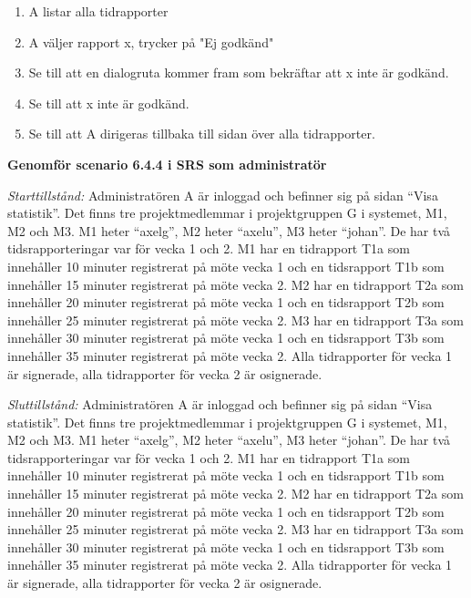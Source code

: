 \documentclass[a4paper]{article}
\begin{document}
\begin{ST}
\begin{enumerate}
\item A listar alla tidrapporter
\item A väljer rapport x, trycker på "Ej godkänd"
\item Se till att en dialogruta kommer fram som bekräftar att x inte är godkänd.
\item Se till att x inte är godkänd.
\item Se till att A dirigeras tillbaka till sidan över alla tidrapporter.
\end{enumerate}

\item
\textbf{Genomför scenario 6.4.4 i SRS som administratör}

\emph{Starttillstånd:} Administratören A är inloggad och befinner sig på sidan ``Visa statistik''. Det finns tre projektmedlemmar i projektgruppen G i systemet, M1, M2 och M3. M1 heter ``axelg'', M2 heter ``axelu'', M3 heter ``johan''. De har två tidsrapporteringar var för vecka 1 och 2. M1 har en tidrapport T1a som innehåller 10 minuter registrerat på möte vecka 1 och en tidsrapport T1b som innehåller 15 minuter registrerat på möte vecka 2. M2 har en tidrapport T2a som innehåller 20 minuter registrerat på möte vecka 1 och en tidsrapport T2b som innehåller 25 minuter registrerat på möte vecka 2. M3 har en tidrapport T3a som innehåller 30 minuter registrerat på möte vecka 1 och en tidsrapport T3b som innehåller 35 minuter registrerat på möte vecka 2. Alla tidrapporter för vecka 1 är signerade, alla tidrapporter för vecka 2 är osignerade.

\emph{Sluttillstånd:} Administratören A är inloggad och befinner sig på sidan ``Visa statistik''. Det finns tre projektmedlemmar i projektgruppen G i systemet, M1, M2 och M3. M1 heter ``axelg'', M2 heter ``axelu'', M3 heter ``johan''. De har två tidsrapporteringar var för vecka 1 och 2. M1 har en tidrapport T1a som innehåller 10 minuter registrerat på möte vecka 1 och en tidsrapport T1b som innehåller 15 minuter registrerat på möte vecka 2. M2 har en tidrapport T2a som innehåller 20 minuter registrerat på möte vecka 1 och en tidsrapport T2b som innehåller 25 minuter registrerat på möte vecka 2. M3 har en tidrapport T3a som innehåller 30 minuter registrerat på möte vecka 1 och en tidsrapport T3b som innehåller 35 minuter registrerat på möte vecka 2. Alla tidrapporter för vecka 1 är signerade, alla tidrapporter för vecka 2 är osignerade.


\end{ST}
\end{document}
